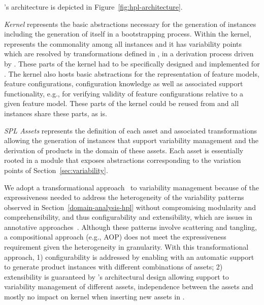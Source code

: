 
\hpl's architecture is depicted in Figure~\ref{fig:hpl-architecture}. 

\emph{Kernel} represents the basic abstractions necessary for the generation of \hpl{} instances including the generation of \hpl{} itself in a bootstrapping process. Within the kernel, \hpbase{} represents the commonality among all \hpl{} instances and it has variability points which are resolved by transformations defined in \hpsplasset, in a derivation process driven by \hpproduct. These parts of the kernel had to be specifically designed and implemented for \hpl. The kernel also hosts basic abstractions for the representation of feature models, feature configurations, configuration knowledge as well as associated support functionality, e.g., for verifying validity of feature configurations relative to a given feature model. These parts of the kernel could be reused from \hp{} and all \hpl{} instances share these parts, as is.

\textit{SPL Assets} represents the definition of each asset and associated transformations allowing the generation of \hpl{} instances that support variability management and the derivation of products in the domain of these assets. Each asset is essentially rooted in a module that exposes abstractions corresponding to the variation points of Section~\ref{sec:variability}.


We adopt a transformational approach~\cite{deltaSchaefer} to variability management because of the expressiveness needed to address the heterogeneity of the variability patterns observed in Section~\ref{domain-analysis-hpl} without compromising modularity and comprehensibility, and thus configurability and extensibility, which are issues in annotative approaches~\cite{kastner:2008}. Although these patterns involve scattering and tangling, a compositional approach (e.g., AOP) does not meet the expressiveness requirement given the heterogeneity in granularity. With this transformational approach, 1) configurability is addressed by enabling \hpl{} with an automatic support to generate product instances with different combinations of assets; 2) extensibility is guaranteed by \hpl{}'s architectural design allowing support to variability management of different assets, independence between the assets and mostly no impact on kernel when inserting new assets in \hpl.


